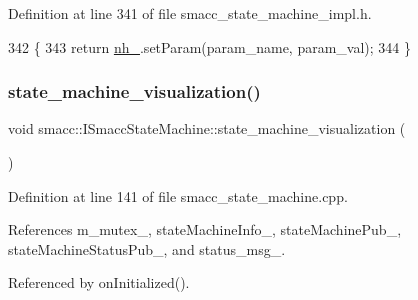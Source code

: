 Definition at line 341 of file smacc\+\_\+state\+\_\+machine\+\_\+impl.\+h.


\begin{DoxyCode}
342 \{
343   \textcolor{keywordflow}{return} \hyperlink{classsmacc_1_1ISmaccStateMachine_ad8877bcca9dbb345fe72cca839c93dd3}{nh\_}.setParam(param\_name, param\_val);
344 \}
\end{DoxyCode}
\mbox{\label{classsmacc_1_1ISmaccStateMachine_ac03029f770422d0ea77ea9856b8cb1a8}} 
\subsubsection{\texorpdfstring{state\+\_\+machine\+\_\+visualization()}{state\_machine\_visualization()}}
{\footnotesize\ttfamily void smacc\+::\+I\+Smacc\+State\+Machine\+::state\+\_\+machine\+\_\+visualization (\begin{DoxyParamCaption}\item[{const ros\+::\+Timer\+Event \&}]{ }\end{DoxyParamCaption})}



Definition at line 141 of file smacc\+\_\+state\+\_\+machine.\+cpp.



References m\+\_\+mutex\+\_\+, state\+Machine\+Info\+\_\+, state\+Machine\+Pub\+\_\+, state\+Machine\+Status\+Pub\+\_\+, and status\+\_\+msg\+\_\+.



Referenced by on\+Initialized().


